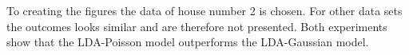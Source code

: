 To creating the figures the data of house number 2 is chosen. For other data sets the outcomes looks similar and are therefore not presented. Both experiments show that the LDA-Poisson model outperforms the LDA-Gaussian model.
 
 
% 
% 










